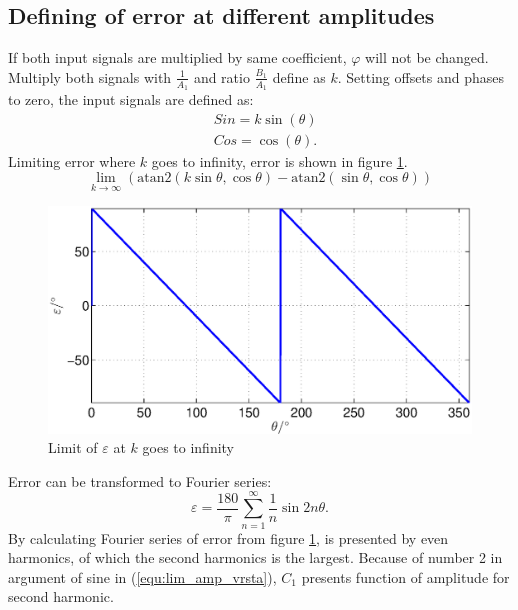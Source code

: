 \documentclass[a4paper]{article}
\begin{document}
\subsection{Defining of error at different amplitudes}
If both input signals are multiplied by same coefficient, $\varphi$ will not  be changed. Multiply both signals with $\frac{1}{A_1}$ and ratio $\frac{B_1}{A_1}$ define as $k$. Setting offsets and phases to zero, the input signals are defined as:
	\begin{eqnarray}
	\label{equ:def_sin_ama}
	&Sin = k \sin(\theta)\\
	\label{equ:def_cos_amp}
	&Cos =\cos(\theta).
	\end{eqnarray}
Limiting error where $k$ goes to infinity, error is shown in figure \ref{fig:lim_amp}.
\begin{equation}
\label{equ:amp_lim}
\lim_{k \rightarrow \infty} (\mathrm{atan2}(k \sin{\theta},\cos{\theta})-\mathrm{atan2}(\sin{\theta},\cos{\theta}))
\end{equation}
\begin{figure}[!htb]
	\begin{center}
		\includegraphics[width=\linewidth]{./Slike/lim_amp.eps}
		\caption{Limit of $\varepsilon$ at $k$ goes to infinity} \label{fig:lim_amp}
	\end{center}
\end{figure}
Error  can be transformed to Fourier series:
\begin{equation}
\label{equ:lim_amp_vrsta}
\varepsilon = \frac{180}{\pi}\sum_{n=1}^{\infty}\frac{1}{n} \sin 2 n \theta.
\end{equation}
By calculating Fourier series of error from figure \ref{fig:lim_amp}, is presented by even harmonics, of which the second harmonics is the largest.
Because of number 2 in argument of sine in (\ref{equ:lim_amp_vrsta}), $C_1$ presents function of amplitude for second harmonic. 
\end{document}
